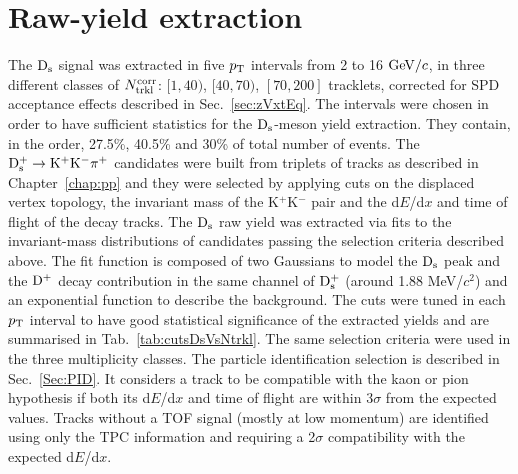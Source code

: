 \section {Raw-yield extraction}
\label{sec:Rawyields_vs_mult}
The ${\rm D_s}$ signal was extracted in five $p_{\rm T}$ intervals from 2 to 16 $\mathrm{GeV}/c$, 
in three different classes of $N_{\rm trkl}^{\rm corr}$: $[1,40)$, $[40,70)$, $[70,200]$ tracklets,
corrected for SPD acceptance effects described in Sec.~\ref{sec:zVxtEq}.
The intervals were chosen in order to have sufficient statistics for the ${\rm D_s}$-meson yield extraction.
They contain, in the order, 27.5\%, 40.5\% and 30\% of total number of events.
The ${\rm D^{+}_\mathrm{s}\to K^+ K^-\pi^+}$ candidates were built from triplets of tracks as described in Chapter~\ref{chap:pp}
and they were selected by applying cuts on the displaced vertex topology, the
invariant mass of the K$^+$K$^-$ pair and the d$E$/d$x$ and time of flight of the decay tracks.
The ${\rm D_s}$ raw yield was extracted via fits to the invariant-mass distributions of candidates passing the
selection criteria described above. The fit function is composed of two Gaussians to model
the ${\rm D_s}$ peak and the ${\rm D^+}$ decay contribution in the same channel of ${\rm D_s^+}$ (around 1.88 MeV/$c^2$) 
and an exponential function to describe the background.
The cuts were tuned in each $p_{\rm T}$ interval to have good statistical significance of the extracted yields
and are summarised in Tab.~\ref{tab:cutsDsVsNtrkl}. The same selection criteria
were used in the three multiplicity classes. The particle identification selection is described in Sec.~\ref{Sec:PID}. 
It considers a track to be compatible with the kaon or pion hypothesis if both its d$E$/d$x$ and time of flight 
are within 3$\sigma$ from the expected values. Tracks without a TOF signal 
(mostly at low momentum) are identified using only the TPC information and requiring a 2$\sigma$ 
compatibility with the expected d$E$/d$x$. 
